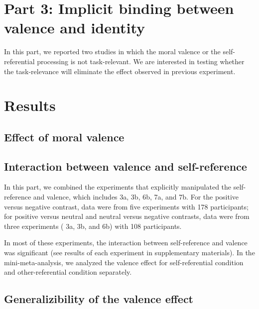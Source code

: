 \documentclass[
  english,
  man]{apa6}
\begin{document}
\hypertarget{part-3-implicit-binding-between-valence-and-identity}{%
\section{Part 3: Implicit binding between valence and identity}\label{part-3-implicit-binding-between-valence-and-identity}}

In this part, we reported two studies in which the moral valence or the self-referential processing is not task-relevant. We are interested in testing whether the task-relevance will eliminate the effect observed in previous experiment.

\hypertarget{results}{%
\section{Results}\label{results}}

\hypertarget{effect-of-moral-valence}{%
\subsection{Effect of moral valence}\label{effect-of-moral-valence}}

\hypertarget{interaction-between-valence-and-self-reference}{%
\subsection{Interaction between valence and self-reference}\label{interaction-between-valence-and-self-reference}}

In this part, we combined the experiments that explicitly manipulated the self-reference and valence, which includes 3a, 3b, 6b, 7a, and 7b. For the positive versus negative contrast, data were from five experiments with 178 participants; for positive versus neutral and neutral versus negative contrasts, data were from three experiments ( 3a, 3b, and 6b) with 108 participants.

In most of these experiments, the interaction between self-reference and valence was significant (see results of each experiment in supplementary materials). In the mini-meta-analysis, we analyzed the valence effect for self-referential condition and other-referential condition separately.

\hypertarget{generalizibility-of-the-valence-effect}{%
\subsection{Generalizibility of the valence effect}\label{generalizibility-of-the-valence-effect}}
\end{document}
